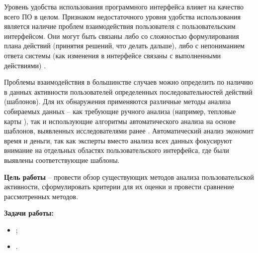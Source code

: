 
Уровень удобства использования программного интерфейса влияет на качество всего ПО в целом. Признаком недостаточного уровня удобства использования является наличие проблем взаимодействия пользователя с пользовательским интерфейсом. Они могут быть связаны либо со сложностью формулирования плана действий (принятия решений, что делать дальше), либо с непониманием ответа системы (как изменения в интерфейсе связаны с выполненными действиями) \cite{1}.

Проблемы взаимодействия в большинстве случаев можно определить по наличию в данных активности пользователей определенных последовательностей действий (шаблонов). Для их обнаружения применяются различные методы анализа собираемых данных – как требующие ручного анализа (например, тепловые карты \cite{2,3}), так и использующие алгоритмы автоматического анализа \cite{1} на основе шаблонов, выявленных исследователями ранее \cite{4, 5, 6}. Автоматический анализ экономит время и деньги, так как эксперты вместо анализа всех данных фокусируют внимание на отдельных областях пользовательского интерфейса,
где были выявлены соответствующие шаблоны.


\textbf{Цель работы} – провести обзор существующих методов анализа пользовательской активности, сформулировать критерии для их оценки и провести сравнение рассмотренных методов.

\textbf{Задачи работы:}
\begin{itemize}
	\item ;
	\item .
\end{itemize}

